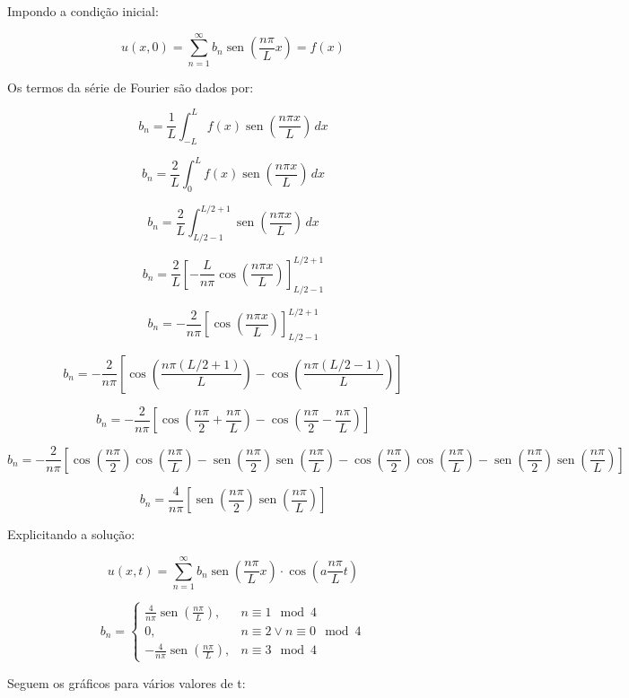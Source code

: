 \documentclass[12pt, a4paper, portuguese]{fphw}
\DeclareMathOperator{\sen}{sen}
\begin{document}
Impondo a condição inicial:

$$
u(x, 0) = \sum_{n=1}^{\infty}
b_n \sen \left( \frac{n \pi}{L} x \right)
= f(x)
$$

Os termos da série de Fourier são dados por:

$$
b_n = \frac{1}{L} \int_{-L}^{L} f(x) \sen \left( \frac{n\pi x}{L}\right)\, dx
$$

$$
b_n = \frac{2}{L} \int_{0}^{L} f(x) \sen \left( \frac{n\pi x}{L}\right)\, dx
$$

$$
b_n = \frac{2}{L} \int_{L/2-1}^{L/2+1} \sen \left( \frac{n\pi x}{L}\right)\, dx
$$

$$
b_n = \frac{2}{L} \left[ -\frac{L}{n\pi}\cos \left( \frac{n\pi x}{L}\right) \right]_{L/2-1}^{L/2+1}
$$

$$
b_n = -\frac{2}{n\pi} \left[\cos \left( \frac{n\pi x}{L}\right) \right]_{L/2-1}^{L/2+1}
$$

$$
b_n = -\frac{2}{n\pi} \left[\cos \left( \frac{n\pi (L/2+1)}{L}\right) - \cos \left( \frac{n\pi (L/2-1)}{L}\right) \right]
$$

$$
b_n = -\frac{2}{n\pi} \left[\cos \left( \frac{n\pi}{2} + \frac{n \pi}{L} \right) - \cos \left( \frac{n\pi}{2} - \frac{n \pi}{L} \right) \right]
$$

$$
b_n = -\frac{2}{n\pi} \left[
\cos \left( \frac{n\pi}{2} \right) \cos \left( \frac{n \pi}{L} \right)
-
\sen \left( \frac{n\pi}{2} \right) \sen \left( \frac{n \pi}{L} \right)
-
\cos \left( \frac{n\pi}{2} \right) \cos \left( \frac{n \pi}{L} \right)
-
\sen \left( \frac{n\pi}{2} \right) \sen \left( \frac{n \pi}{L} \right)
\right]
$$

$$
b_n = \frac{4}{n\pi} \left[
\sen \left( \frac{n\pi}{2} \right) \sen \left( \frac{n \pi}{L} \right)
\right]
$$

Explicitando a solução:

$$
u(x, t) = \sum_{n=1}^{\infty} b_n \sen \left( \frac{n \pi}{L} x \right)
\cdot
\cos \left( a\frac{n \pi}{L} t \right)
$$

$$
b_n = \begin{cases}
\frac{4}{n\pi} \sen \left( \frac{n \pi}{L} \right), &n \equiv 1 \mod 4 \\
0,                               &n \equiv 2 \vee n \equiv 0 \mod 4 \\
-\frac{4}{n\pi} \sen \left( \frac{n \pi}{L} \right), &n \equiv 3 \mod 4 
\end{cases}
$$

Seguem os gráficos para vários valores de t:
\end{document}
